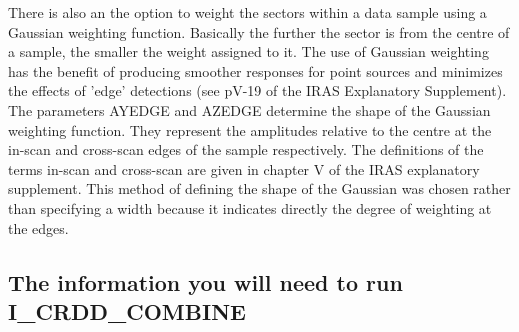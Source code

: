 \documentclass[nolof,noabs,11pt]{starlink}
\begin{document}
    There is also an the option to weight the sectors within a data
sample using a Gaussian weighting function. Basically the further the sector is
from the centre of a sample, the smaller the weight assigned to it. The use
of Gaussian weighting has the benefit of producing smoother responses for
point sources and minimizes the effects of 'edge' detections (see pV-19 of
the IRAS Explanatory Supplement). The parameters AYEDGE and AZEDGE determine
the shape of the Gaussian weighting function. They represent the amplitudes
relative to the centre at the in-scan and cross-scan edges of the sample
respectively. The definitions of the terms in-scan and cross-scan are given in
chapter V of the IRAS explanatory supplement. This method of defining the shape
of the Gaussian was chosen rather than specifying a width because it indicates
directly the degree of weighting at the edges.

\subsection{The information you will need to run I\_CRDD\_COMBINE}
\end{document}
